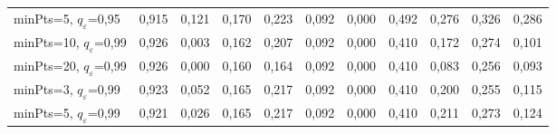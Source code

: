 \begin{longtable}{lrrrrrrrrrr}
minPts=5, $q_\varepsilon$=0,95 & 0,915 & 0,121 & 0,170 & 0,223 & 0,092 & 0,000 & 0,492 & 0,276 & 0,326 & 0,286 \\
minPts=10, $q_\varepsilon$=0,99 & 0,926 & 0,003 & 0,162 & 0,207 & 0,092 & 0,000 & 0,410 & 0,172 & 0,274 & 0,101 \\
minPts=20, $q_\varepsilon$=0,99 & 0,926 & 0,000 & 0,160 & 0,164 & 0,092 & 0,000 & 0,410 & 0,083 & 0,256 & 0,093 \\
minPts=3, $q_\varepsilon$=0,99 & 0,923 & 0,052 & 0,165 & 0,217 & 0,092 & 0,000 & 0,410 & 0,200 & 0,255 & 0,115 \\
minPts=5, $q_\varepsilon$=0,99 & 0,921 & 0,026 & 0,165 & 0,217 & 0,092 & 0,000 & 0,410 & 0,211 & 0,273 & 0,124 \\
\bottomrule
\end{longtable}
